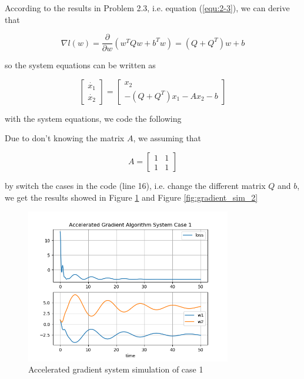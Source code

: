 \documentclass[titlepage]{article}
\begin{document}
According to the results in Problem 2.3, i.e. equation (\ref{equ:2-3}), we can derive that

\begin{equation}
    \nabla l(w)=\frac{\partial}{\partial w}(w^TQw+b^Tw)=(Q+Q^T)w+b
\end{equation}

so the system equations can be written as

\begin{equation}
    \begin{bmatrix}
        \dot{x_1}\\\dot{x_2}
    \end{bmatrix}
    =\begin{bmatrix}
        x_2\\-(Q+Q^T)x_1-Ax_2-b
    \end{bmatrix}
\end{equation}

with the system equations, we code the following



Due to don't knowing the matrix $A$, we assuming that

\begin{equation}
    A=\begin{bmatrix}
        1 & 1 \\ 1 & 1
    \end{bmatrix}
\end{equation}

by switch the cases in the code (line 16),
i.e. change the different matrix $Q$ and $b$,
we get the results showed in Figure \ref{fig:gradient_sim_1} and Figure \ref{fig:gradient_sim_2}

\begin{figure}[htbp]
    \centering
    \includegraphics[width=0.8\textwidth]{img/accelerated_gradient_simulation_case_1.png}
    \caption{Accelerated gradient system simulation of case 1}
    \label{fig:gradient_sim_1}
\end{figure}
\end{document}
